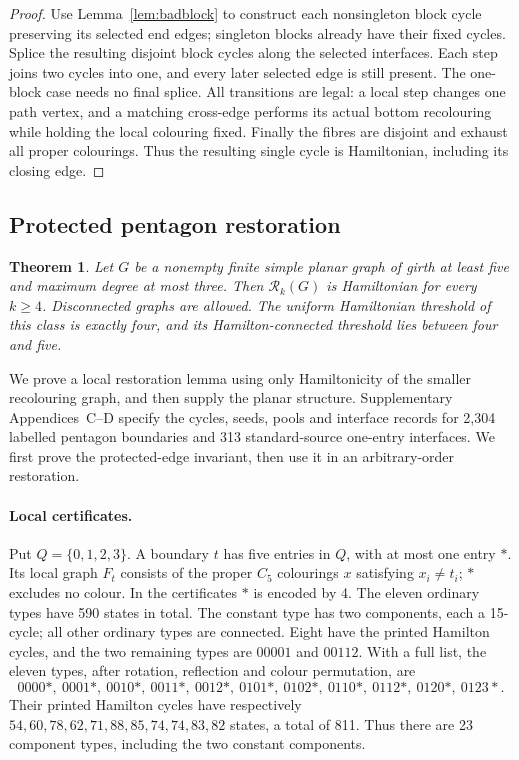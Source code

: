 \documentclass[11pt]{article}
\newtheorem{theorem}{Theorem}[section]
\theoremstyle{remark}
\newcommand{\Rk}{\mathcal R_k}
\numberwithin{equation}{section}
\numberwithin{table}{section}
\begin{document}
\begin{proof}
Use Lemma~\ref{lem:badblock} to construct each nonsingleton block
cycle preserving its selected end edges; singleton blocks already
have their fixed cycles. Splice the resulting disjoint block cycles
along the selected interfaces. Each step joins two cycles into one,
and every later selected edge is still present. The one-block case
needs no final splice. All transitions are legal: a local step changes
one path vertex, and a matching cross-edge performs its actual bottom
recolouring while holding the local colouring fixed. Finally the fibres
are disjoint and exhaust all proper colourings. Thus the resulting
single cycle is Hamiltonian, including its closing edge.
\end{proof}


\subsection{Protected pentagon restoration}
\begin{theorem}\label{thm:subcubic}
Let $G$ be a nonempty finite simple planar graph of girth at least five
and maximum degree at most three. Then $\Rk(G)$ is Hamiltonian for
every $k\ge4$. Disconnected graphs are allowed. The uniform Hamiltonian threshold
of this class is exactly four, and its Hamilton-connected threshold lies
between four and five.
\end{theorem}

We prove a local restoration lemma using only Hamiltonicity of the
smaller recolouring graph, and then supply the planar structure.
Supplementary Appendices~C--D specify the cycles, seeds, pools and
interface records for 2,304 labelled pentagon boundaries and 313
standard-source one-entry interfaces. We first prove the protected-edge
invariant, then use it in an arbitrary-order restoration.

\paragraph{Local certificates.}
Put $Q=\{0,1,2,3\}$. A boundary $t$ has five entries in $Q$, with at most
one entry $\ast$. Its local graph $F_t$ consists of the proper $C_5$
colourings $x$ satisfying $x_i\ne t_i$; $\ast$ excludes no colour.
In the certificates $\ast$ is encoded by 4.
The eleven ordinary types have 590 states in total.
The constant type has two components, each a 15-cycle; all other
ordinary types are connected. Eight have the printed Hamilton cycles,
and the two remaining types are $00001$ and $00112$.
With a full list, the eleven types, after rotation, reflection and
colour permutation, are
\[
0000\ast,\ 0001\ast,\ 0010\ast,\ 0011\ast,\ 0012\ast,\
0101\ast,\ 0102\ast,\ 0110\ast,\ 0112\ast,\ 0120\ast,\ 0123\ast.
\]
Their printed Hamilton cycles have respectively
$54,60,78,62,71,88,85,74,74,83,82$ states, a total of 811.
Thus there are 23 component types, including the two constant components.
\end{document}
